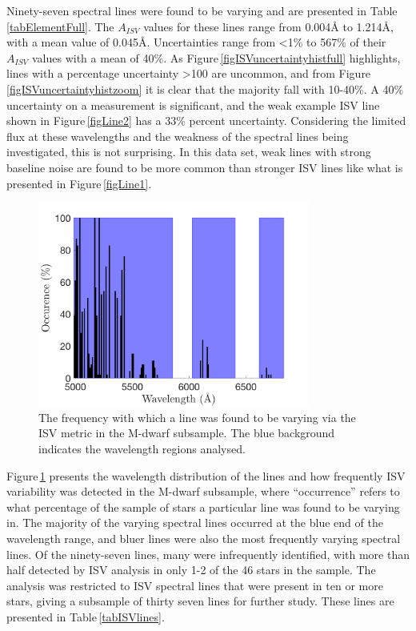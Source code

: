 Ninety-seven spectral lines were found to be varying and are presented in Table\,\ref{tabElementFull}. The $A_{ISV}$ values for these lines range from 0.004\hbox{\AA} to 1.214\hbox{\AA}, with a mean value of 0.045\hbox{\AA}. Uncertainties range from \textless1\% to 567\% of their $A_{ISV}$ values with a mean of 40\%. As Figure\,\ref{figISVuncertaintyhistfull} highlights, lines with a percentage uncertainty \textgreater100 are uncommon, and from Figure\,\ref{figISVuncertaintyhistzoom} it is clear that the majority fall with 10-40\%. A 40\% uncertainty on a measurement is significant, and the weak example ISV line shown in Figure\,\ref{figLine2} has a 33\% percent uncertainty. Considering the limited flux at these wavelengths and the weakness of the spectral lines being investigated, this is not surprising. In this data set, weak lines with strong baseline noise are found to be more common than stronger ISV lines like what is presented in Figure\,\ref{figLine1}.\\

\begin{figure}
    \centering
    \includegraphics[width=0.8\textwidth]{ISVlineHist.png}
    \caption{The frequency with which a line was found to be varying via the ISV metric in the M-dwarf subsample. The blue background indicates the wavelength regions analysed.}
    \label{figlineHist}
\end{figure}

Figure\,\ref{figlineHist} presents the wavelength distribution of the lines and how frequently ISV variability was detected in the M-dwarf subsample, where ``occurrence'' refers to what percentage of the sample of stars a particular line was found to be varying in. The majority of the varying spectral lines occurred at the blue end of the wavelength range, and bluer lines were also the most frequently varying spectral lines. Of the ninety-seven lines, many were infrequently identified, with more than half detected by ISV analysis in only 1-2 of the 46 stars in the sample. The analysis was restricted to ISV spectral lines that were present in ten or more stars, giving a subsample of thirty seven lines for further study. These lines are presented in Table\,\ref{tabISVlines}.\\

